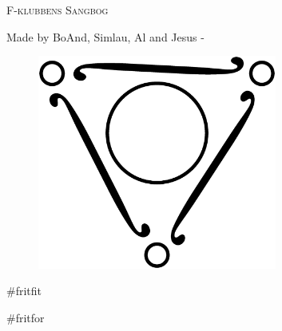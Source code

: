 


	

\setcounter{page}{1}
\begin{center}
{\Huge\textsc{F-klubbens Sangbog}}
\end{center}
\vspace{0.4cm}


\begin{center}
{Made by BoAnd, Simlau, Al and Jesus - \the\year{}}
\vspace{1.5cm}
\end{center}
\begin{figure}[h!]
  \centering
    \includegraphics[width=0.7\textwidth]{images/fklubben.eps}
\end{figure}
\thispagestyle{empty}
\newpage
\#fritfit

\#fritfor
~~~
\thispagestyle{empty}
\newpage
{\fontsize{8}{10}\selectfont
\printindex}
\setcounter{page}{3}

\newlength{\mylength}
\setlength{\mylength}{\unitlength}
\setlength{\unitlength}{1cm}

